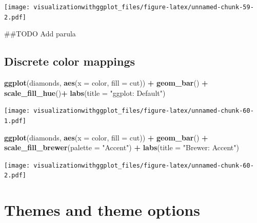 \documentclass[]{krantz}
\makeatletter
\newenvironment{Shaded}{\begin{snugshade}}{\end{snugshade}}
\newcommand{\KeywordTok}[1]{\textcolor[rgb]{0.13,0.29,0.53}{\textbf{#1}}}
\newcommand{\DataTypeTok}[1]{\textcolor[rgb]{0.13,0.29,0.53}{#1}}
\newcommand{\StringTok}[1]{\textcolor[rgb]{0.31,0.60,0.02}{#1}}
\newcommand{\OperatorTok}[1]{\textcolor[rgb]{0.81,0.36,0.00}{\textbf{#1}}}
\newcommand{\NormalTok}[1]{#1}
\newenvironment{kframe}{%
\medskip{}
\setlength{\fboxsep}{.8em}
 \def\at@end@of@kframe{}%
 \ifinner\ifhmode%
  \def\at@end@of@kframe{\end{minipage}}%
  \begin{minipage}{\columnwidth}%
 \fi\fi%
 \def\FrameCommand##1{\hskip\@totalleftmargin \hskip-\fboxsep
 \colorbox{shadecolor}{##1}\hskip-\fboxsep
     \hskip-\linewidth \hskip-\@totalleftmargin \hskip\columnwidth}%
 \MakeFramed {\advance\hsize-\width
   \@totalleftmargin\z@ \linewidth\hsize
   \@setminipage}}%
 {\par\unskip\endMakeFramed%
 \at@end@of@kframe}
\renewenvironment{Shaded}{\begin{kframe}}{\end{kframe}}
\theoremstyle{definition}
\theoremstyle{definition}
\theoremstyle{definition}
\theoremstyle{remark}
\makeatother
\begin{document}
\texttt{[image: visualizationwithggplot\_files/figure-latex/unnamed-chunk-59-2.pdf]}

\begin{Shaded}
\begin{Highlighting}[]
\NormalTok{##TODO Add parula}
\end{Highlighting}
\end{Shaded}

\subsection{Discrete color mappings}\label{discrete-color-mappings}

\begin{Shaded}
\begin{Highlighting}[]
\KeywordTok{ggplot}\NormalTok{(diamonds, }\KeywordTok{aes}\NormalTok{(}\DataTypeTok{x =}\NormalTok{ color, }\DataTypeTok{fill =}\NormalTok{ cut)) }\OperatorTok{+}\StringTok{ }
\StringTok{    }\KeywordTok{geom_bar}\NormalTok{() }\OperatorTok{+}
\StringTok{  }\KeywordTok{scale_fill_hue}\NormalTok{()}\OperatorTok{+}\StringTok{ }
\StringTok{  }\KeywordTok{labs}\NormalTok{(}\DataTypeTok{title =} \StringTok{"ggplot: Default"}\NormalTok{)}
\end{Highlighting}
\end{Shaded}

\texttt{[image: visualizationwithggplot\_files/figure-latex/unnamed-chunk-60-1.pdf]}

\begin{Shaded}
\begin{Highlighting}[]
\KeywordTok{ggplot}\NormalTok{(diamonds, }\KeywordTok{aes}\NormalTok{(}\DataTypeTok{x =}\NormalTok{ color, }\DataTypeTok{fill =}\NormalTok{ cut)) }\OperatorTok{+}\StringTok{  }\KeywordTok{geom_bar}\NormalTok{() }\OperatorTok{+}\StringTok{ }
\StringTok{  }\KeywordTok{scale_fill_brewer}\NormalTok{(}\DataTypeTok{palette =} \StringTok{"Accent"}\NormalTok{) }\OperatorTok{+}\StringTok{ }
\StringTok{  }\KeywordTok{labs}\NormalTok{(}\DataTypeTok{title =} \StringTok{"Brewer: Accent"}\NormalTok{)}
\end{Highlighting}
\end{Shaded}

\texttt{[image: visualizationwithggplot\_files/figure-latex/unnamed-chunk-60-2.pdf]}

\section{Themes and theme options}\label{themes-and-theme-options}
\end{document}
